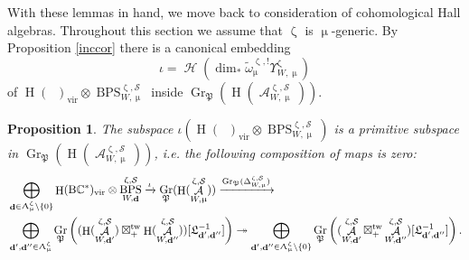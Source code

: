 \documentclass[a4paper,10pt]{amsart}
\renewcommand{\zeta}{\upzeta}
\renewcommand{\Lambda}{\Uplambda}
\renewcommand{\mu}{\upmu}
\newtheorem{proposition}[theorem]{Proposition}
\DeclareMathOperator{\BC}{B\mathbb{C}^*}
\DeclareMathOperator{\Pf}{\mathfrak{P}}
\newcommand{\SP}{\mathcal{S}}
\DeclareMathOperator{\tw}{tw}
\DeclareMathOperator{\Gr}{Gr}
\DeclareMathOperator{\dd}{\mathbf{d}}
\DeclareMathOperator{\DT}{BPS}
\DeclareMathOperator{\vir}{vir}
\DeclareMathOperator{\Ho}{\mathcal{H}}
\DeclareMathOperator{\HO}{H}
\DeclareMathOperator{\Coha}{\mathcal{A}}
\begin{document}
With these lemmas in hand, we move back to consideration of cohomological Hall algebras.  Throughout this section we assume that $\zeta$ is $\mu$-generic.  By Proposition \ref{inccor} there is a canonical embedding 
\[
\iota=\Ho(\dim_*\tilde{\omega}^{\zeta,!}_{\mu}\Upsilon_{W,\mu}^{\zeta})
\]
of $\HO(\BC )_{\vir}\otimes \DT_{W,\mu}^{\zeta,\SP}$ inside $\Gr_{\Pf}(\HO(\Coha^{\zeta,\SP}_{W,\mu}))$.
\begin{proposition}
\label{primitivity}
The subspace $\iota(\HO(\BC )_{\vir}\otimes \DT_{W,\mu}^{\zeta,\SP})$ is a primitive subspace in $\Gr_{\Pf}(\HO(\Coha_{W,\mu}^{\zeta,\SP}))$, i.e. the following composition of maps is zero:
\begin{align*}
&\bigoplus_{\dd\in \Lambda_{\mu}^{\zeta}\setminus\{0\}}\HO(\BC )_{\vir}\otimes\DT_{W,\dd}^{\zeta,\SP}\xrightarrow{\iota}\Gr_{\Pf}(\HO(\Coha^{\zeta,\SP}_{W,\mu}))\xrightarrow{\Gr_{\Pf}(\Delta^{\zeta,\SP}_{W,\mu})}\\&\bigoplus_{\dd',\dd''\in\Lambda_{\mu}^{\zeta}}\Gr_{\Pf}\left((\HO(\Coha^{\zeta,\SP}_{W,\dd'})\boxtimes^{\tw}_+\HO(\Coha^{\zeta,\SP}_{W,\dd''}))[\mathfrak{L}_{\dd',\dd''}^{-1}]\right)
\twoheadrightarrow \bigoplus_{\dd',\dd''\in\Lambda_{\mu}^{\zeta}\setminus\{0\}}\Gr_{\Pf}\left((\Coha^{\zeta,\SP}_{W,\dd'}\boxtimes^{\tw}_+\Coha^{\zeta,\SP}_{W,\dd''})[\mathfrak{L}_{\dd',\dd''}^{-1}]\right).
\end{align*}
\end{proposition}
\end{document}
